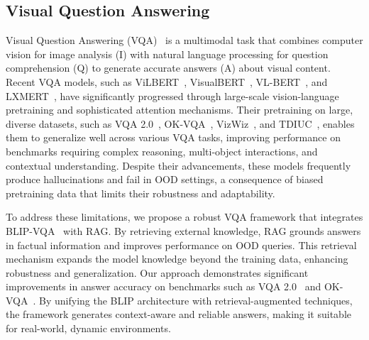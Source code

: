 \subsection{Visual Question Answering}
Visual Question Answering (VQA)~\cite{antol2015vqa, marino2019ok, zhang2016yin, goyal2017making} is a multimodal task that combines computer vision for image analysis (I) with natural language processing for question comprehension (Q) to generate accurate answers (A) about visual content. Recent VQA models, such as ViLBERT~\cite{lu2019vilbert}, VisualBERT~\cite{li2019visualbert}, VL-BERT~\cite{su2019vl}, and LXMERT~\cite{tan2019lxmert}, have significantly progressed through large-scale vision-language pretraining and sophisticated attention mechanisms. Their pretraining on large, diverse datasets, such as VQA 2.0~\cite{goyal2017making}, OK-VQA~\cite{marino2019ok}, VizWiz~\cite{bigham2010vizwiz}, and TDIUC~\cite{kafle2017analysis}, enables them to generalize well across various VQA tasks, improving performance on benchmarks requiring complex reasoning, multi-object interactions, and contextual understanding. Despite their advancements, these models frequently produce hallucinations and fail in OOD settings, a consequence of biased pretraining data that limits their robustness and adaptability.

To address these limitations, we propose a robust VQA framework that integrates BLIP-VQA~\cite{li2022blip} with RAG. By retrieving external knowledge, RAG grounds answers in factual information and improves performance on OOD queries. This retrieval mechanism expands the model knowledge beyond the training data, enhancing robustness and generalization. Our approach demonstrates significant improvements in answer accuracy on benchmarks such as VQA 2.0~\cite{goyal2017making} and OK-VQA~\cite{marino2019ok}. By unifying the BLIP architecture with retrieval-augmented techniques, the framework generates context-aware and reliable answers, making it suitable for real-world, dynamic environments.

